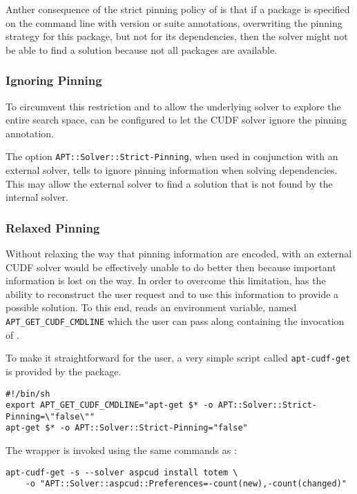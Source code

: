 Anther consequence of the strict pinning policy of \aptget{} is that
if a package is specified on the command line with version or suite
annotations, overwriting the pinning strategy for this package, but
not for its dependencies, then the solver might not be able to
find a solution because not all packages are available. 

\subsubsection{Ignoring Pinning}
To circumvent this restriction and to allow the underlying solver to
explore the entire search space, \aptget{} can be configured to let the
CUDF solver ignore the pinning annotation.

The option \texttt{APT::Solver::Strict-Pinning}, when used in
conjunction with an external solver, tells \aptget{} to ignore pinning
information when solving dependencies. This may allow the external
solver to find a solution that is not found by the \aptget{}
internal solver.

\subsubsection{Relaxed Pinning}
Without relaxing the way that pinning information are encoded,
\aptcudf{} with an external CUDF solver would be effectively unable to
do better then \aptget{} because important information is lost on the
way. In order to overcome this limitation, \aptcudf{} has the ability
to reconstruct the user request and to use this information to provide
a possible solution. To this end, \aptcudf{} reads an environment
variable, named \texttt{APT\_GET\_CUDF\_CMDLINE} which the user can
pass along containing the invocation of \aptget.

To make it straightforward for the user, a very simple script called
\texttt{apt-cudf-get} is provided by the \aptcudf{} package.

\begin{verbatim}
#!/bin/sh
export APT_GET_CUDF_CMDLINE="apt-get $* -o APT::Solver::Strict-Pinning=\"false\""
apt-get $* -o APT::Solver::Strict-Pinning="false"
\end{verbatim}

The wrapper is invoked using the same commands as \aptget:

\begin{verbatim}
apt-cudf-get -s --solver aspcud install totem \
    -o "APT::Solver::aspcud::Preferences=-count(new),-count(changed)"
\end{verbatim}
